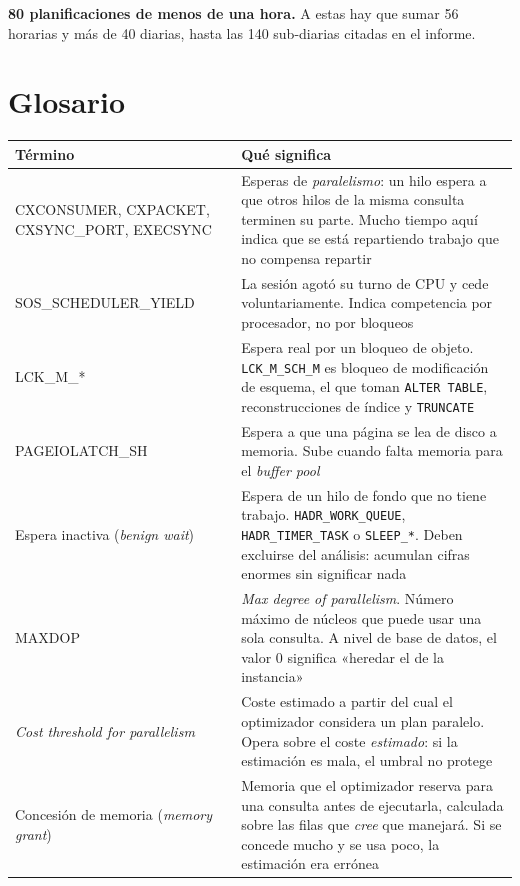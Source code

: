 \documentclass[11pt,a4paper]{article}
\newcommand{\cod}[1]{\texttt{\small #1}}
\begin{document}
\noindent \textbf{80 planificaciones de menos de una hora.} A estas hay que
sumar 56 horarias y más de 40 diarias, hasta las 140 sub-diarias citadas en
el informe.

\newpage
\section{Glosario}

\begin{longtable}{p{4.6cm}p{11.2cm}}
\toprule
\textbf{Término} & \textbf{Qué significa} \\
\midrule
\endhead
CXCONSUMER, CXPACKET, CXSYNC\_PORT, EXECSYNC
  & Esperas de \emph{paralelismo}: un hilo espera a que otros hilos de la
    misma consulta terminen su parte. Mucho tiempo aquí indica que se está
    repartiendo trabajo que no compensa repartir \\
SOS\_SCHEDULER\_YIELD
  & La sesión agotó su turno de CPU y cede voluntariamente. Indica
    competencia por procesador, no por bloqueos \\
LCK\_M\_*
  & Espera real por un bloqueo de objeto. \cod{LCK\_M\_SCH\_M} es bloqueo de
    modificación de esquema, el que toman \cod{ALTER TABLE},
    reconstrucciones de índice y \cod{TRUNCATE} \\
PAGEIOLATCH\_SH
  & Espera a que una página se lea de disco a memoria. Sube cuando falta
    memoria para el \emph{buffer pool} \\
Espera inactiva (\emph{benign wait})
  & Espera de un hilo de fondo que no tiene trabajo. \cod{HADR\_WORK\_QUEUE},
    \cod{HADR\_TIMER\_TASK} o \cod{SLEEP\_*}. Deben excluirse del análisis:
    acumulan cifras enormes sin significar nada \\
MAXDOP
  & \emph{Max degree of parallelism}. Número máximo de núcleos que puede usar
    una sola consulta. A nivel de base de datos, el valor 0 significa
    «heredar el de la instancia» \\
\emph{Cost threshold for parallelism}
  & Coste estimado a partir del cual el optimizador considera un plan
    paralelo. Opera sobre el coste \emph{estimado}: si la estimación es mala,
    el umbral no protege \\
Concesión de memoria (\emph{memory grant})
  & Memoria que el optimizador reserva para una consulta antes de
    ejecutarla, calculada sobre las filas que \emph{cree} que manejará. Si se
    concede mucho y se usa poco, la estimación era errónea \\

\end{longtable}
\end{document}
